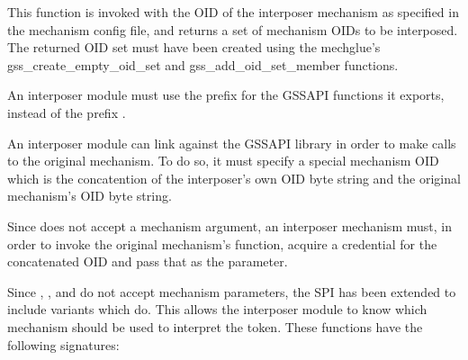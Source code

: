 \documentclass[letterpaper,10pt,english]{sphinxmanual}
\begin{document}
%
\begin{sphinxVerbatim}[commandchars=\\\{\}]
  
\end{sphinxVerbatim}

This function is invoked with the OID of the interposer mechanism as
specified in the mechanism config file, and returns a set of mechanism
OIDs to be interposed.  The returned OID set must have been created
using the mechglue’s gss\_create\_empty\_oid\_set and
gss\_add\_oid\_set\_member functions.

An interposer module must use the prefix  for the GSSAPI
functions it exports, instead of the prefix .

An interposer module can link against the GSSAPI library in order to
make calls to the original mechanism.  To do so, it must specify a
special mechanism OID which is the concatention of the interposer’s
own OID byte string and the original mechanism’s OID byte string.

Since  does not accept a mechanism argument,
an interposer mechanism must, in order to invoke the original
mechanism’s function, acquire a credential for the concatenated OID
and pass that as the  parameter.

Since , , and
 do not accept mechanism parameters, the SPI
has been extended to include variants which do.  This allows the
interposer module to know which mechanism should be used to interpret
the token.  These functions have the following signatures:
\end{document}
